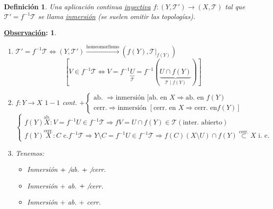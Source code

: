 \documentclass[10pt,a4paper,openright]{book}
\theoremstyle{break}
\newtheorem*{defi}{Definición}
\newtheorem*{obs}{\underline{Observación}:}
\begin{document}
\begin{defi}
Una aplicación continua \underline{inyectiva} $f: \left( Y, \mathcal{T}' \right) \rightarrow \left( X, \mathcal{T} \right)$ tal que $\mathcal{T}' = f^{-1} \mathcal{T}$ se llama \underline{inmersión} (se suelen omitir las topologías).
\end{defi}

\begin{obs}
\begin{enumerate}
    \item $\mathcal{T}' = f^{-1}\mathcal{T} \Leftrightarrow \left( Y, \mathcal{T}' \right) \xrightarrow{\text{homeomorfismo}} \left( f\left( Y \right), \mathcal{T}|_{f\left( Y \right)} \right)$
    \[
    [V \in f^{-1}\mathcal{T} \Leftrightarrow V = f^{-1}\underbrace{U}_{\mathcal{T}} = f^{-1}\left( \underbrace{U \cap f\left( Y \right)}_{\mathcal{T}\mid f\left( Y \right)} \right)] 
    \]

    \item $f: Y \rightarrow X$ $1-1$ cont. $+ \begin{cases}
        \text{ab. } \Rightarrow \text{inmersión } [\text{ab. en } X \Rightarrow \text{ab. en } f\left( Y \right)\\
        \text{cerr.} \Rightarrow \text{inmersión } [\text{cerr. en } X \Rightarrow \text{cerr. en} f\left( Y \right)] 
    \end{cases} $
    \[
    \begin{cases}
        f\left( Y \right) \stackrel{\text{ab.}} X: V = f^{-1}U \in f^{-1}\mathcal{T} \Rightarrow fV = U \cap f\left( Y \right) \in \mathcal{T} \left( \text{inter. abierto} \right)\\
        f\left( Y \right) \stackrel{\text{cerr.}} X: C \text{ c.} f^{-1}\mathcal{T} \Rightarrow Y\setminus C = f^{-1} U \in f^{-1}\mathcal{T} \Rightarrow f\left( C \right) \left( X\setminus U \right) \cap f\left( Y \right) \stackrel{\text{cerr.}}{\subset} X \text{ i. c.} 
    \end{cases} 
    \]

    \item Tenemos: 
    \begin{itemize}
        \item Inmersión $ + \not$ ab. $+ \not$ cerr.
        \item Inmersión $+$ ab. $+ \not $ cerr.
        \item Inmersión $+$ ab. $+$ cerr.
    \end{itemize}
\end{enumerate}
\end{obs}
\end{document}
